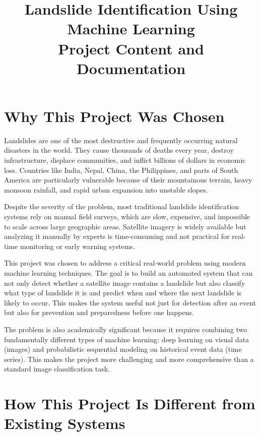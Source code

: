 \documentclass[11pt]{article}
\title{Landslide Identification Using Machine Learning \\ \large Project Content and Documentation}
\author{}
\date{}
\begin{document}
\maketitle
\tableofcontents
\newpage

\section{Why This Project Was Chosen}

Landslides are one of the most destructive and frequently occurring natural disasters in the world. They cause thousands of deaths every year, destroy infrastructure, displace communities, and inflict billions of dollars in economic loss. Countries like India, Nepal, China, the Philippines, and parts of South America are particularly vulnerable because of their mountainous terrain, heavy monsoon rainfall, and rapid urban expansion into unstable slopes.

Despite the severity of the problem, most traditional landslide identification systems rely on manual field surveys, which are slow, expensive, and impossible to scale across large geographic areas. Satellite imagery is widely available but analyzing it manually by experts is time-consuming and not practical for real-time monitoring or early warning systems.

This project was chosen to address a critical real-world problem using modern machine learning techniques. The goal is to build an automated system that can not only detect whether a satellite image contains a landslide but also classify what type of landslide it is and predict when and where the next landslide is likely to occur. This makes the system useful not just for detection after an event but also for prevention and preparedness before one happens.

The problem is also academically significant because it requires combining two fundamentally different types of machine learning: deep learning on visual data (images) and probabilistic sequential modeling on historical event data (time series). This makes the project more challenging and more comprehensive than a standard image classification task.

\section{How This Project Is Different from Existing Systems}
\end{document}
